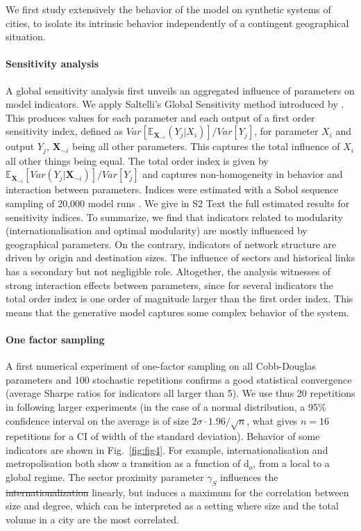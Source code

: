 \documentclass[10pt,letterpaper]{article}
\providecommand{\DIFadd}[1]{{\protect\color{blue}\uwave{#1}}} %
\providecommand{\DIFdel}[1]{{\protect\color{red}\sout{#1}}}                      %
\providecommand{\DIFaddbegin}{} %
\providecommand{\DIFaddend}{} %
\providecommand{\DIFdelbegin}{} %
\providecommand{\DIFdelend}{} %
\begin{document}
We first study extensively the behavior of the model on synthetic systems of cities, to isolate its intrinsic behavior independently of a contingent geographical situation.

\paragraph{Sensitivity analysis}

A global sensitivity analysis first unveils an aggregated influence of parameters on model indicators. We apply Saltelli's Global Sensitivity method introduced by \cite{saltelli2008global}. This produces values for each parameter and each output of a first order sensitivity index, defined as $Var\left[\mathbb{E}_{\mathbf{X}_{\sim i}}\left(Y_j | X_i\right)\right] / Var\left[Y_j\right]$, for parameter $X_i$ and output $Y_j$, $\mathbf{X}_{\sim i}$ being all other parameters. This captures the total influence of $X_i$ all other things being equal. The total order index is given by $\mathbb{E}_{\mathbf{X}_{\sim i}} \left[Var(Y_j | \mathbf{X}_{\sim i})\right] / Var\left[Y_j\right]$ and captures non-homogeneity in behavior and interaction between parameters. Indices were estimated with a Sobol sequence sampling of 20,000 model runs \cite{saltelli2010variance}. We give in S2 Text the full estimated results for sensitivity indices. To summarize, we find that indicators related to modularity (internationalisation and optimal modularity) are mostly influenced by geographical parameters. On the contrary, indicators of network structure are driven by origin and destination sizes. The influence of sectors and historical links has a secondary but not negligible role. Altogether, the analysis witnesses of strong interaction effects between parameters, since for several indicators the total order index is one order of magnitude larger than the first order index. This means that the generative model captures some complex behavior of the system.



\paragraph{One factor sampling}

A first numerical experiment of one-factor sampling on all Cobb-Douglas parameters and 100 stochastic repetitions confirms a good statistical convergence (average Sharpe ratios for indicators all larger than 5). We use thus 20 repetitions in following larger experiments (in the case of a normal distribution, a 95\% confidence interval on the average is of size $2\sigma \cdot 1.96 / \sqrt{n}$, what gives $n=16$ repetitions for a CI of width of the standard deviation). Behavior of some indicators are shown in Fig.~\ref{fig:fig4}. For example, internationalisation and metropolisation both show a transition as a function of d$_o$, from a local to a global regime. The sector proximity parameter $\gamma_S$ influences the \DIFdelbegin \DIFdel{internationalization }\DIFdelend \DIFaddbegin \DIFadd{internationalisation }\DIFaddend linearly, but induces a maximum for the correlation between size and degree, which can be interpreted as a setting where size and the total volume in a city are the most correlated.
\end{document}
